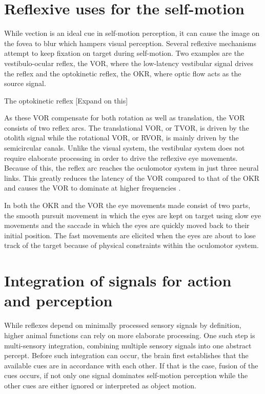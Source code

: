 \section{Reflexive uses for the self-motion}
While vection is an ideal cue in self-motion perception, it can cause the image on the fovea to blur which hampers visual perception. Several reflexive mechanisms attempt to keep fixation on target during self-motion. Two examples are the vestibulo-ocular reflex, the VOR, where the low-latency vestibular signal drives the reflex and the optokinetic reflex, the OKR, where optic flow acts as the source signal.

The optokinetic reflex [Expand on this]

As these VOR compensate for both rotation as well as translation, the VOR consists of two reflex arcs. The translational VOR, or TVOR, is driven by the otolith signal while the rotational VOR, or RVOR, is mainly driven by the semicircular canals. Unlike the visual system, the vestibular system does not require elaborate processing in order to drive the reflexive eye movements. Because of this, the reflex arc reaches the oculomotor system in just three neural links. This greatly reduces the latency of the VOR compared to that of the OKR and causes the VOR to dominate at higher frequencies \cite{schweigart1997}.

In both the OKR and the VOR the eye movements made consist of two parts, the smooth pursuit movement in which the eyes are kept on target using slow eye movements and the saccade in which the eyes are quickly moved back to their initial position. The fast movements are elicited when the eyes are about to lose track of the target because of physical constraints within the oculomotor system.



\section{Integration of signals for action and perception}
While reflexes depend on minimally processed sensory signals by definition, higher animal functions can rely on more elaborate processing. One such step is multi-sensory integration, combining multiple sensory signals into one abstract percept. Before such integration can occur, the brain first establishes that the available cues are in accordance with each other. If that is the case, fusion of the cues occurs, if not only one signal dominates self-motion perception while the other cues are either ignored or interpreted as object motion.

